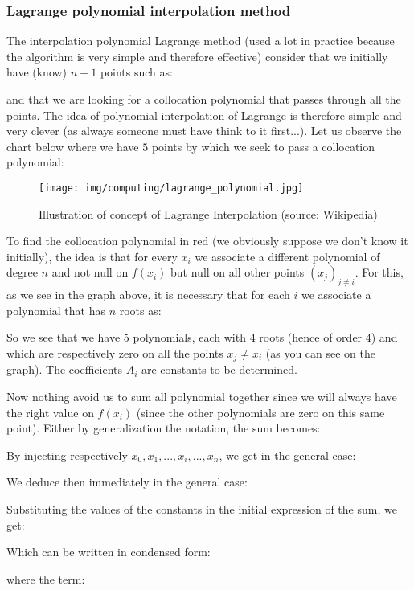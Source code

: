 	\pagebreak
	\subsubsection{Lagrange polynomial interpolation method}\label{lagrange polynomial interpolation method}
	The interpolation  polynomial Lagrange method (used a lot in practice because the algorithm is very simple and therefore effective) consider that we initially have (know) $n + 1$ points such as:
	
	and that we are looking for a collocation polynomial that passes through all the points. The idea of polynomial interpolation of Lagrange is therefore simple and very clever (as always someone must have think to it first...). Let us observe the chart below where we have $5$ points by which we seek to pass a collocation polynomial:
	\begin{figure}[H]
		\centering
		\texttt{[image: img/computing/lagrange\_polynomial.jpg]}
		\caption[Illustration of concept of Lagrange Interpolation]{Illustration of concept of Lagrange Interpolation (source: Wikipedia)}
	\end{figure}
	To find the collocation polynomial in red (we obviously suppose we don't know it initially), the idea is that for every $x_i$ we associate a different polynomial of degree $n$ and not null on $f(x_i)$ but null on all other points $(x_j)_{j\neq i}$. For this, as we see in the graph above, it is necessary that for each $i$ we associate a polynomial that has $n$ roots as:
	
	So we see that we have $5$ polynomials, each with $4$ roots (hence of order $4$) and which are respectively zero on all the points $x_j\neq x_i$ (as you can see on the graph). The coefficients $A_i$ are constants to be determined.
	
	Now nothing avoid us to sum all polynomial together since we will always have the right value on $f(x_i)$ (since the other polynomials are zero on this same point). Either by generalization the notation, the sum becomes:
	
	By injecting respectively $x_0,x_1,...,x_i,...,x_n$, we get in the general case:
	
	We deduce then immediately in the general case:
	
	Substituting the values of the constants in the initial expression of the sum, we get:
	
	Which can be written in condensed form:
	
	where the term:
	
